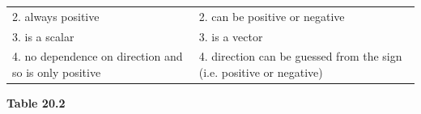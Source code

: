 {{\begin{center}
\begin{xtabular}[t]{|l|l|}
        2. always positive &
    
    
        2. can be positive or negative%
     \tabularnewline{}
    
    
        3. is a scalar &
    
    
        3. is a vector%
     \tabularnewline{}
    
    
        4. no dependence on direction and so is only positive &
    
    
        4. direction can be guessed from the sign (i.e. positive or negative)%
     \tabularnewline{}
    \end{xtabular}
      \end{center}
    \begin{center}{\small\bfseries Table 20.2}\end{center}
    
    \addtocounter{footnote}{-0}
    
}}
